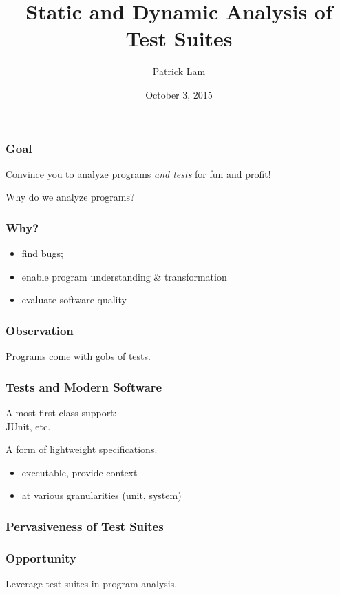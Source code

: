 \documentclass{beamer}
\title{Static and Dynamic Analysis of Test Suites}
\author{Patrick Lam}
\date{October 3, 2015}
\newenvironment{changemargin}[1]{%
  \begin{list}{}{%
    \setlength{\topsep}{0pt}%
    \setlength{\leftmargin}{#1}%
    \setlength{\rightmargin}{1em}
    \setlength{\listparindent}{\parindent}%
    \setlength{\itemindent}{\parindent}%
    \setlength{\parsep}{\parskip}%
  }%
  \item[]}{\end{list}}
\begin{document}
\begin{frame}
  \titlepage
\end{frame}

\begin{frame}
  \frametitle{Goal}
  \Large
  \begin{changemargin}{1cm}
Convince you to analyze programs \emph{and tests} for fun and profit!
  \end{changemargin}
\end{frame}


\begin{frame}
  \centering
  \LARGE
  Why do we analyze programs?
\end{frame}

\begin{frame}
  \frametitle{Why?}
  \Large
  \begin{changemargin}{1cm}
    \begin{itemize}
    \item find bugs;
    \item enable program understanding \& transformation
    \item evaluate software quality
    \end{itemize}
  \end{changemargin}
\end{frame}


\begin{frame}
  \frametitle{Observation}
  \centering
  \LARGE Programs come with gobs of tests.
\end{frame}

\begin{frame}
  \frametitle{Tests and Modern Software}
  Almost-first-class support:\\
  JUnit, etc.

  A form of lightweight specifications.
  \begin{itemize}
  \item executable, provide context
  \item at various granularities (unit, system)
  \end{itemize}
\end{frame}

\begin{frame}
  \frametitle{Pervasiveness of Test Suites}
\end{frame}

\begin{frame}
  \frametitle{Opportunity}
  Leverage test suites in program analysis.
\end{frame}
\end{document}
